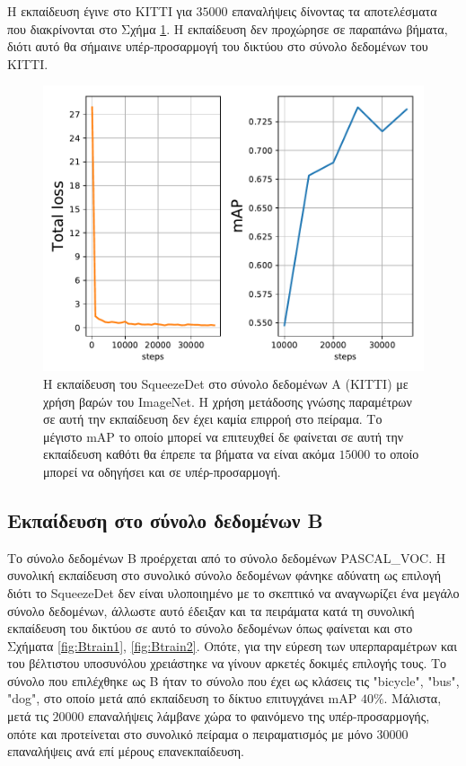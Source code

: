 Η εκπαίδευση έγινε στο KITTI για $35000$ επαναλήψεις δίνοντας τα αποτελέσματα που διακρίνονται στο Σχήμα \ref{fig:Atrain}. Η εκπαίδευση δεν προχώρησε σε παραπάνω βήματα, διότι αυτό θα σήμαινε υπέρ-προσαρμογή του δικτύου στο σύνολο δεδομένων του KITTI.

\begin{figure}
\centering
\includegraphics[width = \textwidth]{figures/experiments/Atrain.pdf}
\caption[Η εκπαίδευση του SqueezeDet στο σύνολο δεδομένων A, με χρήση βαρών του ImageNet]{Η εκπαίδευση του SqueezeDet στο σύνολο δεδομένων A (KITTI) με χρήση βαρών του ImageNet. Η χρήση μετάδοσης γνώσης παραμέτρων σε αυτή την εκπαίδευση δεν έχει καμία επιρροή στο πείραμα. Το μέγιστο mAP το οποίο μπορεί να επιτευχθεί δε φαίνεται σε αυτή την εκπαίδευση καθότι θα έπρεπε τα βήματα να είναι ακόμα $15000$ το οποίο μπορεί να οδηγήσει και σε υπέρ-προσαρμογή.}
\label{fig:Atrain}
\end{figure}

\subsection{Εκπαίδευση στο σύνολο δεδομένων Β}
\label{subsection:Btrain}
Το σύνολο δεδομένων Β προέρχεται από το σύνολο δεδομένων PASCAL\_VOC. Η συνολική εκπαίδευση στο συνολικό σύνολο δεδομένων φάνηκε αδύνατη ως επιλογή διότι το SqueezeDet δεν είναι υλοποιημένο με το σκεπτικό να αναγνωρίζει ένα μεγάλο σύνολο δεδομένων, άλλωστε αυτό έδειξαν και τα πειράματα κατά τη συνολική εκπαίδευση του δικτύου σε αυτό το σύνολο δεδομένων όπως φαίνεται και στο Σχήματα \ref{fig:Btrain1}, \ref{fig:Btrain2}. Οπότε, για την εύρεση των υπερπαραμέτρων και του βέλτιστου υποσυνόλου χρειάστηκε να γίνουν αρκετές δοκιμές επιλογής τους. Το σύνολο που επιλέχθηκε ως B ήταν το σύνολο που έχει ως κλάσεις τις "bicycle", "bus", "dog", στο οποίο μετά από εκπαίδευση το δίκτυο επιτυγχάνει mAP $40\%$. Μάλιστα, μετά τις $20000$ επαναλήψεις λάμβανε χώρα το φαινόμενο της υπέρ-προσαρμογής, οπότε και προτείνεται στο συνολικό πείραμα ο πειραματισμός με μόνο $30000$ επαναλήψεις ανά επί μέρους επανεκπαίδευση.

